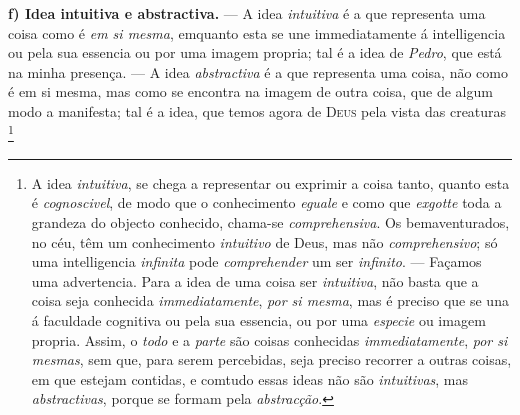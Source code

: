 \textbf{f) Idea intuitiva e abstractiva.} --- A idea \emph{intuitiva} é a que representa uma coisa como é \emph{em si mesma}, emquanto esta se une immediatamente á intelligencia ou pela sua essencia ou por uma imagem propria; tal é a idea de \emph{Pedro}, que está na minha presença. --- A idea \emph{abstractiva} é a que representa uma coisa, não como é em si mesma, mas como se encontra na imagem de outra coisa, que de algum modo a manifesta; tal é a idea, que temos agora de \textsc{Deus} pela vista das creaturas \footnote{A idea \emph{intuitiva}, se chega a representar ou exprimir a coisa tanto, quanto esta é \emph{cognoscivel}, de modo que o conhecimento \emph{eguale} e como que \emph{exgotte} toda a grandeza do objecto conhecido, chama-se \emph{comprehensiva}. Os bemaventurados, no céu, têm um conhecimento \emph{intuitivo} de Deus, mas não \emph{comprehensivo}; só uma intelligencia \emph{infinita} pode \emph{comprehender} um ser \emph{infinito}. --- Façamos uma advertencia. Para a idea de uma coisa ser \emph{intuitiva}, não basta que a coisa seja conhecida \emph{immediatamente}, \emph{por si mesma}, mas é preciso que se una á faculdade cognitiva ou pela sua essencia, ou por uma \emph{especie} ou imagem propria. Assim, o \emph{todo} e a \emph{parte} são coisas conhecidas \emph{immediatamente}, \emph{por si mesmas}, sem que, para serem percebidas, seja preciso recorrer a outras coisas, em que estejam contidas, e comtudo essas ideas não são \emph{intuitivas}, mas \emph{abstractivas}, porque se formam pela \emph{abstracção}.}


